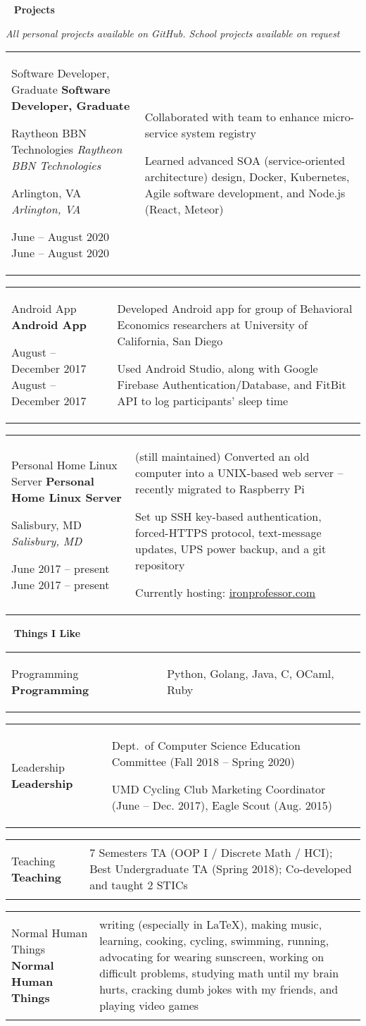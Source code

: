 \documentclass[11pt,letterpaper]{article}
\newcommand{\sect}[1]{
	\begin{center}
		\noindent\xrfill[0.7ex]{0.5pt} \mbox{ } {\Large \bf #1} \mbox{ } \xrfill[0.7ex]{0.5pt}
	\end{center}
}
\newcommand{\entry}[5]{
	{\small
	\noindent
	\begin{tabular}{p{2in} p{\dimexpr \linewidth-2\tabcolsep-2.25in}} %
		\ifx #1  \else \noindent \textbf{#1} \fi
		
		\ifx #2  \else \noindent \textit{#2} \fi
		
		\ifx #3  \else \noindent \textit{#3} \fi
		
		\ifx #4  \else \noindent #4 \fi
		&
		#5
	\end{tabular}
	}
	\vspace{1mm}
}
\begin{document}
\sect{Projects}
\vspace{-5mm}
\begin{center}
	{\small \textit{All personal projects available on GitHub. School projects available on request}}
\end{center}

\entry{Software Developer, Graduate}{Raytheon BBN Technologies}{Arlington, VA}{June -- August 2020}{
	Collaborated with team to enhance micro-service system registry
	
	Learned advanced SOA (service-oriented architecture) design, Docker, Kubernetes, Agile software development, and Node.js (React, Meteor)
}

\entry{Android App}{}{}{August -- December 2017}{
	Developed Android app for group of Behavioral Economics researchers at University of California, San Diego
	
	Used Android Studio, along with Google Firebase Authentication/Database, and FitBit API to log participants' sleep time
}

\entry{Personal Home Linux Server}{}{Salisbury, MD}{June 2017 -- present}{
	(still maintained) Converted an old computer into a UNIX-based web server -- recently migrated to Raspberry Pi
	
	Set up SSH key-based authentication, forced-HTTPS protocol, text-message updates, UPS power backup, and a git repository
		
	Currently hosting: \href{https://ironprofessor.com}{ironprofessor.com}
}


\sect{Things I Like}

\entry{Programming}{}{}{}{
	Python, Golang, Java, C, OCaml, Ruby
}

\entry{Leadership}{}{}{}{
	Dept.\ of Computer Science Education Committee (Fall 2018 -- Spring 2020)
	
	UMD Cycling Club Marketing Coordinator (June -- Dec. 2017), Eagle Scout (Aug. 2015)
}

\entry{Teaching}{}{}{}{
	7 Semesters TA (OOP I / Discrete Math / HCI); Best Undergraduate TA (Spring 2018); Co-developed and taught 2 STICs
}

\entry{Normal Human Things}{}{}{}{
	writing (especially in \LaTeX), making music, learning, cooking, cycling, swimming, running, advocating for wearing sunscreen, working on difficult problems, studying math until my brain hurts, cracking dumb jokes with my friends, and playing video games
}
\end{document}
